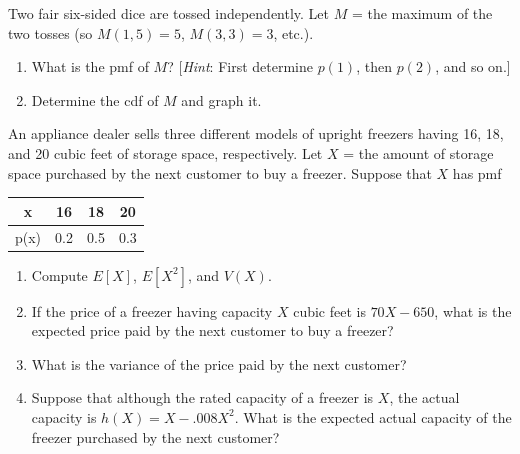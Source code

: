 \documentclass[11pt,letterpaper,boxed]{hmcpset}
\newcommand{\bk}[1]{\left[ #1 \right]}
\begin{document}
{\begin{solution}
	\vfill
\end{solution}
\newpage


\begin{problem}[3.2.18]
	Two fair six-sided dice are tossed independently. Let $M$ = the maximum of the two tosses (so $M(1,5) = 5$, $M(3,3) = 3$, etc.).
	\begin{enumerate}
		\item
			What is the pmf of $M$? [\textit{Hint}: First determine $p(1)$, then
$p(2)$, and so on.]
		\item
			Determine the cdf of $M$ and graph it.
	\end{enumerate}
\end{problem}

\begin{solution}
	\vfill
\end{solution}
\newpage


\begin{problem}[3.3.32]
	An appliance dealer sells three different models of upright freezers having 16, 18, and 20 cubic feet of storage space, respectively. Let $X$ = the amount of storage space purchased by the next customer to buy a freezer. Suppose that $X$ has pmf
	\begin{center}
		\begin{tabular}{c|c c c}
			x & 16 & 18 & 20\\
 			\hline
 			p(x) & 0.2 & 0.5 & 0.3 \\
	 	\end{tabular}
	\end{center}
	\begin{enumerate}
		\item
            Compute $E\bk{X}$, $E\bk{X^2}$, and $V(X)$.
		\item
			If the price of a freezer having capacity $X$ cubic feet is $70X - 650$, what is the expected price paid by the next customer to buy a freezer?
		\item
			What is the variance of the price paid by the next customer?
		\item
			Suppose that although the rated capacity of a freezer is $X$, the actual capacity is $h(X) = X - .008X^2$. What is the expected actual capacity of the freezer purchased by the next customer?
	\end{enumerate}
\end{problem}

}
\end{document}
